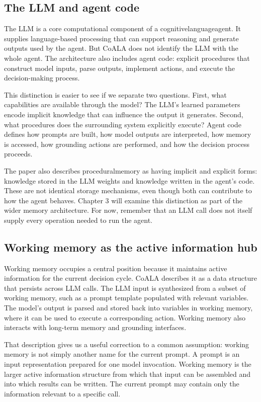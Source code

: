 \subsection{The LLM and agent code}

The LLM is a core computational component of a \gls{cognitivelanguageagent}. It supplies language-based processing that can support reasoning and generate outputs used by the agent. But CoALA does not identify the LLM with the whole agent. The architecture also includes agent code: explicit procedures that construct model inputs, parse outputs, implement actions, and execute the decision-making process.

This distinction is easier to see if we separate two questions. First, what capabilities are available through the model? The LLM's learned parameters encode implicit knowledge that can influence the output it generates. Second, what procedures does the surrounding system explicitly execute? Agent code defines how prompts are built, how model outputs are interpreted, how memory is accessed, how grounding actions are performed, and how the decision process proceeds.

The paper also describes \gls{proceduralmemory} as having implicit and explicit forms: knowledge stored in the LLM weights and knowledge written in the agent's code. These are not identical storage mechanisms, even though both can contribute to how the agent behaves. Chapter 3 will examine this distinction as part of the wider memory architecture. For now, remember that an LLM call does not itself supply every operation needed to run the agent.

\subsection{Working memory as the active information hub}

Working memory occupies a central position because it maintains active information for the current decision cycle. CoALA describes it as a data structure that persists across LLM calls. The LLM input is synthesized from a subset of working memory, such as a prompt template populated with relevant variables. The model's output is parsed and stored back into variables in working memory, where it can be used to execute a corresponding action. Working memory also interacts with long-term memory and grounding interfaces.

That description gives us a useful correction to a common assumption: working memory is not simply another name for the current prompt. A prompt is an input representation prepared for one model invocation. Working memory is the larger active information structure from which that input can be assembled and into which results can be written. The current prompt may contain only the information relevant to a specific call.

